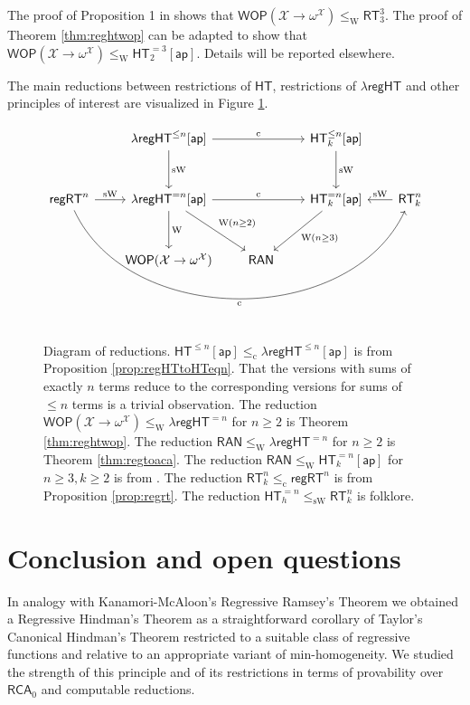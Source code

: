 \documentclass[a4paper,11pt]{article}
\newcommand\RCA{\mathsf{RCA}}
\newcommand\HT{\mathsf{HT}}
\newcommand\RT{\mathsf{RT}}
\newcommand\regHT{\mathsf{regHT}}
\newcommand\REG{\mathsf{regRT}}
\newcommand\compred{\mathrm{c}}
\newcommand\W{\mathrm{W}}
\newcommand\sW{\mathrm{sW}}
\newcommand\ap{\mathsf{ap}}
\newcommand\ordX{\mathcal{X}}
\newcommand\WOP{\mathsf{WOP}}
\newcommand\RAN{\mathsf{RAN}}
\begin{document}
The proof of Proposition 1 in \cite{Car-Zda:12} shows that $\WOP(\ordX\to \omega^\ordX) \leq_\W \RT^3_3$. 
The proof of Theorem \ref{thm:reghtwop} can be adapted to show that $\WOP(\ordX\to \omega^\ordX) \leq_\W \HT^{=3}_2[\ap]$. Details will be reported elsewhere.

The main reductions between restrictions of $\HT$, restrictions of $\lambda\regHT$ and other principles of interest are visualized in 
Figure \ref{fig:reductions}.

\begin{figure}
\centering
\[\begin{tikzcd}[row sep=3em,column sep=2em]
& \lambda\regHT^{\leq n}[\ap] \arrow[d, "\sW"] \arrow[rr, "\compred"] & & \HT^{\leq n}_k[\ap]  \arrow[d, "\sW"] & \\
\REG^n \arrow[r, "\sW"] \arrow[rrrr, bend right=65, "\compred" below] & \lambda\regHT^{= n}[\ap] \arrow[d, "\W"] \arrow[rr, "\compred"] \arrow[dr, "\W (n\geq 2)"]  & & \HT^{= n}_k[\ap] \arrow[dl, "\W (n\geq 3)"]  
&  \arrow[l, "\sW" above] \RT^n_k  \\
& \WOP(\ordX \to \omega^\ordX) & \RAN & & 
\end{tikzcd}\]
\caption{Diagram of reductions. $\HT^{\leq n}[\ap] \leq_\compred \lambda\regHT^{\leq n}[\ap]$ is from Proposition \ref{prop:regHTtoHTeqn}.
That the versions with sums of exactly $n$ terms reduce to the corresponding versions for sums of $\leq n$ terms is a trivial observation. The reduction $\WOP(\ordX\to \omega^\ordX)\leq_\W \lambda\regHT^{=n}$ for $n\geq 2$ is Theorem \ref{thm:reghtwop}. The reduction $\RAN \leq_\W \lambda\regHT^{=n}$ for $n\geq 2$ is Theorem \ref{thm:regtoaca}. The reduction $\RAN \leq_\W \HT^{=n}_k[\ap]$ for $n\geq 3, k\geq 2$ is from \cite{Car-Kol-Lep-Zda:20}. The reduction $\RT^n_k \leq_\compred \REG^n$ is from Proposition \ref{prop:regrt}. The reduction $\HT^{=n}_h \leq_\sW \RT^n_k$ is folklore.} \label{fig:reductions}
\end{figure}



\section{Conclusion and open questions}

In analogy with Kanamori-McAloon's Regressive Ramsey's Theorem \cite{Kan-McA:87} we obtained a Regressive Hindman's Theorem 
as a straightforward corollary of Taylor's Canonical Hindman's Theorem \cite{Tay:76} restricted to a suitable class of regressive functions
and relative to an appropriate variant of min-homogeneity. We studied the strength of this principle and of its 
restrictions in terms of provability over $\RCA_0$ and computable reductions. 
\end{document}
